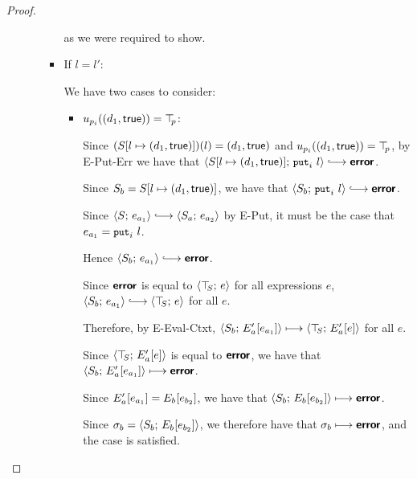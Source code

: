 \begin{proof}
\begin{enumerate}
\begin{enumerate}
\begin{itemize}
        as we were required to show.

      \item If $l = l'$:

        We have two cases to consider:

        \begin{itemize}
        \item $u_{p_i}((d_1, \textsf{true})) = \top\hspace{-0.85mm}_{p}$:


          Since $(S[l \mapsto (d_1, \textsf{true})])(l) =
          (d_1, \textsf{true})$ and
          $u_{p_i}((d_1, \textsf{true})) = \top\hspace{-0.85mm}_{p}$, by {\sc
            E-Put-Err} we have that
          $\config{\extSRaw{S}{l}{\state{d_1}{\frozentrue}}}{\putiexp{l}}
          \parstepsto \error$.

          Since $S_b = S[l \mapsto (d_1, \textsf{true})]$,
          we have that $\config{S_b}{\putiexp{l}} \parstepsto
          \error$.

          Since $\config{S}{e_{a_1}} \parstepsto
          \config{S_a}{e_{a_2}}$ by {\sc E-Put}, it must be the
          case that $e_{a_1} = \mbox{\small{\texttt{put}}}_i~l$.

          Hence $\config{S_b}{e_{a_1}} \parstepsto \error$.

          Since $\textbf{\textsf{error}}$ is equal to $\langle \top\hspace{-0.85mm}_{S};\, e \rangle$ for all
          expressions $e$, $\config{S_b}{e_{a_1}} \parstepsto
          \config{\topS}{e}$ for all $e$.

          Therefore, by {\sc E-Eval-Ctxt},
          $\langle S_b;\, E'_a\hspace{-0.5mm}\left[e_{a_1}\right] \rangle \longmapsto
          \langle \top\hspace{-0.85mm}_{S};\, E'_a\hspace{-0.5mm}\left[e\right] \rangle$ for all $e$.

          Since $\langle \top\hspace{-0.85mm}_{S};\, E'_a\hspace{-0.5mm}\left[e\right] \rangle$ is equal to
          $\textbf{\textsf{error}}$, we have that
          $\langle S_b;\, E'_a\hspace{-0.5mm}\left[e_{a_1}\right] \rangle \longmapsto \textbf{\textsf{error}}$.

          Since $E'_a\hspace{-0.5mm}\left[e_{a_1}\right] =
          E_b\hspace{-0.5mm}\left[e_{b_2}\right]$, we have that
          $\langle S_b;\, E_b\hspace{-0.5mm}\left[e_{b_2}\right] \rangle \longmapsto
          \textbf{\textsf{error}}$.

          Since $\sigma_b = \langle S_b;\, E_b\hspace{-0.5mm}\left[e_{b_2}\right] \rangle$,
          we therefore have that $\sigma_b \longmapsto \textbf{\textsf{error}}$, and
          the case is satisfied.


\end{itemize}
\end{itemize}
\end{enumerate}
\end{enumerate}
\end{proof}
